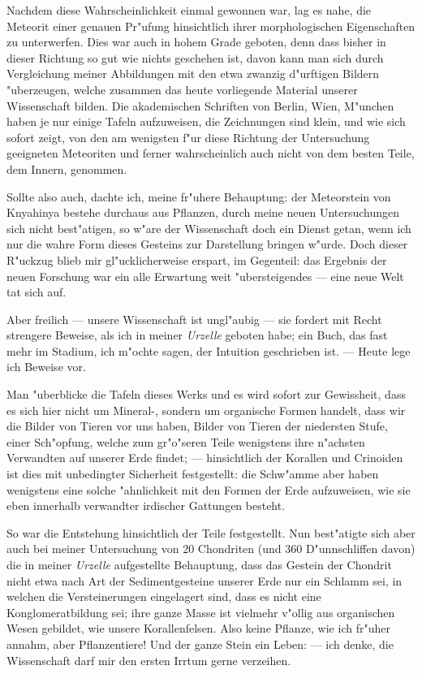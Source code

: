 \documentclass[a4paper, 11pt, oneside]{article}
\begin{document}
Nachdem diese Wahrscheinlichkeit einmal gewonnen war, lag es nahe, die Meteorit einer genauen Pr"ufung hinsichtlich ihrer morphologischen Eigenschaften zu unterwerfen. Dies war auch in hohem Grade geboten, denn dass bisher in dieser Richtung so gut wie nichts geschehen ist, davon kann man sich durch Vergleichung meiner Abbildungen mit den etwa zwanzig d"urftigen Bildern "uberzeugen, welche zusammen das heute vorliegende Material unserer Wissenschaft bilden. Die akademischen Schriften von Berlin, Wien, M"unchen haben je nur einige Tafeln aufzuweisen, die Zeichnungen sind klein, und wie sich sofort zeigt, von den am wenigsten f"ur diese Richtung der Untersuchung geeigneten Meteoriten und ferner wahrscheinlich auch nicht von dem besten Teile, dem Innern, genommen.

Sollte also auch, dachte ich, meine fr"uhere Behauptung: der Meteorstein von Knyahinya bestehe durchaus aus Pflanzen, durch meine neuen Untersuchungen sich nicht best"atigen, so w"are der Wissenschaft doch ein Dienst getan, wenn ich nur die wahre Form dieses Gesteins zur Darstellung bringen w"urde. Doch dieser R"uckzug blieb mir gl"ucklicherweise erspart, im Gegenteil: das Ergebnis der neuen Forschung war ein alle Erwartung weit "ubersteigendes --- eine neue Welt tat sich auf.

Aber freilich --- unsere Wissenschaft ist ungl"aubig --- sie fordert mit Recht strengere Beweise, als ich in meiner \emph{Urzelle} geboten habe; ein Buch, das fast mehr im Stadium, ich m"ochte sagen, der Intuition geschrieben ist. --- Heute lege ich Beweise vor.

Man "uberblicke die Tafeln dieses Werks und es wird sofort zur Gewissheit, dass es sich hier nicht um Mineral-, sondern um organische Formen handelt, dass wir die Bilder von Tieren vor uns haben, Bilder von Tieren der niedersten Stufe, einer Sch"opfung, welche zum gr"o"seren Teile wenigstens ihre n"achsten Verwandten auf unserer Erde findet; --- hinsichtlich der Korallen und Crinoiden ist dies mit unbedingter Sicherheit festgestellt: die Schw"amme aber haben wenigstens eine solche "ahnlichkeit mit den Formen der Erde aufzuweisen, wie sie eben innerhalb verwandter irdischer Gattungen besteht.

So war die Entstehung hinsichtlich der Teile festgestellt. Nun best"atigte sich aber auch bei meiner Untersuchung von 20 Chondriten (und 360 D"unnschliffen davon) die in meiner \emph{Urzelle} aufgestellte Behauptung, dass das Gestein der Chondrit nicht etwa nach Art der Sedimentgesteine unserer Erde nur ein Schlamm sei, in welchen die Versteinerungen eingelagert sind, dass es nicht eine Konglomeratbildung sei; ihre ganze Masse ist vielmehr v"ollig aus organischen Wesen gebildet, wie unsere Korallenfelsen. Also keine Pflanze, wie ich fr"uher annahm, aber Pflanzentiere! Und der ganze Stein ein Leben: --- ich denke, die Wissenschaft darf mir den ersten Irrtum gerne verzeihen.
\end{document}
